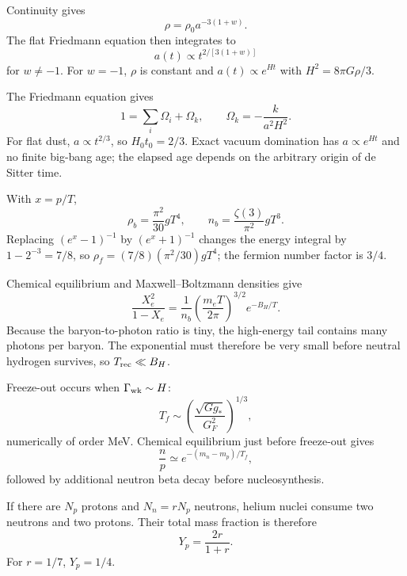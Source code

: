 \begin{solutions}

\begin{solution}
Continuity gives
\[
\rho=\rho_0a^{-3(1+w)}.
\]
The flat Friedmann equation then integrates to
\[
a(t)\propto t^{2/[3(1+w)]}
\]
for \(w\neq-1\).  For \(w=-1\), \(\rho\) is constant and
\(a(t)\propto e^{Ht}\) with \(H^2=8\pi G\rho/3\).
\end{solution}

\begin{solution}
The Friedmann equation gives
\[
1=\sum_i\Omega_i+\Omega_k,\qquad
\Omega_k=-\frac{k}{a^2H^2}.
\]
For flat dust, \(a\propto t^{2/3}\), so \(H_0t_0=2/3\).  Exact vacuum
domination has \(a\propto e^{Ht}\) and no finite big-bang age; the elapsed
age depends on the arbitrary origin of de Sitter time.
\end{solution}

\begin{solution}
With \(x=p/T\),
\[
\rho_b=\frac{\pi^2}{30}gT^4,\qquad
n_b=\frac{\zeta(3)}{\pi^2}gT^3.
\]
Replacing \((e^x-1)^{-1}\) by \((e^x+1)^{-1}\) changes the energy integral by
\(1-2^{-3}=7/8\), so
\(\rho_f=(7/8)(\pi^2/30)gT^4\); the fermion number factor is \(3/4\).
\end{solution}

\begin{solution}
Chemical equilibrium and Maxwell--Boltzmann densities give
\[
\frac{X_e^2}{1-X_e}
=\frac1{n_b}
\left(\frac{m_eT}{2\pi}\right)^{3/2}e^{-B_H/T}.
\]
Because the baryon-to-photon ratio is tiny, the high-energy tail contains
many photons per baryon.  The exponential must therefore be very small
before neutral hydrogen survives, so \(T_{\rm rec}\ll B_H\).
\end{solution}

\begin{solution}
Freeze-out occurs when \(\Gamma_{\rm wk}\sim H\):
\[
T_f\sim
\left(\frac{\sqrt{Gg_\ast}}{G_F^2}\right)^{1/3},
\]
numerically of order MeV.  Chemical equilibrium just before freeze-out gives
\[
\frac np\simeq e^{-(m_n-m_p)/T_f},
\]
followed by additional neutron beta decay before nucleosynthesis.
\end{solution}

\begin{solution}
If there are \(N_p\) protons and \(N_n=rN_p\) neutrons, helium nuclei consume
two neutrons and two protons.  Their total mass fraction is therefore
\[
Y_p=\frac{2r}{1+r}.
\]
For \(r=1/7\), \(Y_p=1/4\).
\end{solution}


\end{solutions}
